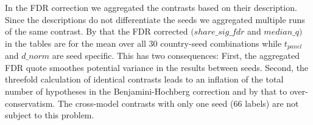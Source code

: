 In the FDR correction we aggregated the contrasts based on their description. Since the descriptions do not differentiate the seeds we aggregated multiple runs of the same contrast. By that the FDR corrected $(share\_sig\_fdr$ and $median\_q)$ in the tables are for the mean over all 30 country-seed combinations while $t_{panel}$ and $d\_norm$ are seed specific. This has two consequences: First, the aggregated FDR quote smoothes potential variance in the results between seeds. Second, the threefold calculation of identical contrasts leads to an inflation of the total number of hypotheses in the Benjamini-Hochberg correction and by that to over-conservatism. The cross-model contrasts with only one seed (66 labels) are not subject to this problem.
